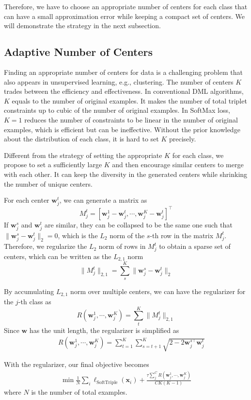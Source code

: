 \documentclass[10pt,twocolumn,letterpaper]{article}
\def \x {\mathbf{x}}
\def \w {\mathbf{w}}
\begin{document}
Therefore, we have to choose an appropriate number of centers for each class that can have a small approximation error while keeping a compact set of centers. We will demonstrate the strategy in the next subsection.

\subsection{Adaptive Number of Centers}

Finding an appropriate number of centers for data is a challenging problem that also appears in unsupervised learning, e.g.,  clustering. The number of centers $K$ trades between the efficiency and effectiveness. In conventional DML algorithms, $K$ equals to the number of original examples. It makes the number of total triplet constraints up to cubic of the number of original examples. In SoftMax loss, $K=1$ reduces the number of constraints to be linear in the number of original examples, which is efficient but can be ineffective. Without the prior knowledge about the distribution of each class, it is hard to set $K$ precisely. 

Different from the strategy of setting the appropriate $K$ for each class, we propose to set a sufficiently large $K$ and then encourage similar centers to merge with each other. It can keep the diversity in the generated centers while shrinking the number of unique centers.

For each center $\w_j^t$, we can generate a matrix as
\[M_j^t = [\w_j^1-\w_j^t,\cdots,\w_j^K-\w_j^t]^\top\]
If $\w_j^s$ and $\w_j^t$ are similar, they can be collapsed to be the same one such that $\|\w_j^s-\w_j^t\|_2=0$, which is the $L_2$ norm of the $s$-th row in the matrix $M_j^t$. Therefore, we regularize the $L_2$ norm of rows in $M_j^t$ to obtain a sparse set of centers, which can be written as the $L_{2,1}$ norm
\[\|M_j^t\|_{2,1} = \sum_s^K \|\w_j^s - \w_j^t\|_2\]

By accumulating $L_{2,1}$ norm over multiple centers, we can have the regularizer for the $j$-th class as 
\[R(\w_j^1,\cdots,\w_j^K) = \sum_t^K\|M_j^t\|_{2,1}\]
Since $\w$ has the unit length, the regularizer is simplified as
\begin{eqnarray}\label{eq:reg}
&&R(\w_j^1,\cdots,\w_j^K) = \sum_{t=1}^K \sum_{s=t+1}^K \sqrt{2-2\w_j^{s\top}\w_j^t}
\end{eqnarray}

With the regularizer, our final objective becomes
\begin{eqnarray}\label{eq:object}
\min \frac{1}{N}\sum_i\ell_{\mathrm{SoftTriple}}(\x_i) +\frac{\tau\sum_j^CR(\w_j^1,\cdots,\w_j^K)}{CK(K-1)}
\end{eqnarray}
where $N$ is the number of total examples.
\end{document}
